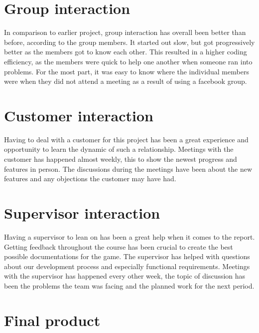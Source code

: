\section{Group interaction}

In comparison to earlier project, group interaction has overall been better than before, according to the group members. It started out slow, but got progressively better as the members got to know each other. This resulted in a higher coding efficiency, as the members were quick to help one another when someone ran into problems. For the most part, it was easy to know where the individual members were when they did not attend a meeting as a result of using a facebook group.

\section{Customer interaction}

Having to deal with a customer for this project has been a great experience and opportunity to learn the dynamic of such a relationship. Meetings with the customer has happened almost weekly, this to show the newest progress and features in person. The discussions during the meetings have been about the new features and any objections the customer may have had. 

\section{Supervisor interaction}
Having a supervisor to lean on has been a great help when it comes to the report. Getting feedback throughout the course has been crucial to create the best possible documentations for the game. The supervisor has helped with questions about our development process and especially functional requirements. Meetings with the supervisor has happened every other week, the topic of discussion has been the problems the team was facing and the planned work for the next period. 

\section{Final product}

